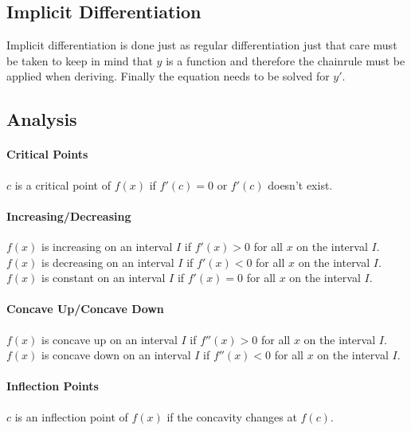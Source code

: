\documentclass[a4paper, 10pt]{article}
\begin{document}
\subsection{Implicit Differentiation}
Implicit differentiation is done just as regular differentiation just that care must be taken to keep in mind that \(y\) is a function and therefore the chainrule must be applied when deriving. Finally the equation needs to be solved for \(y'\).
\subsection{Analysis}
\paragraph{Critical Points}
\( c \) is a critical point of \( f(x) \) if \( f'(c)=0 \) or \( f'(c) \) doesn't exist.
\paragraph{Increasing/Decreasing}
\( f(x) \) is increasing on an interval \(I\) if \( f'(x) > 0 \) for all \(x\) on the interval \(I\).
\( f(x) \) is decreasing on an interval \(I\) if \( f'(x) < 0 \) for all \(x\) on the interval \(I\).
\( f(x) \) is constant on an interval \(I\) if \( f'(x) = 0 \) for all \(x\) on the interval \(I\).
\paragraph{Concave Up/Concave Down}
\( f(x) \) is concave up on an interval \(I\) if \( f''(x) > 0 \) for all \(x\) on the interval \(I\).
\( f(x) \) is concave down on an interval \(I\) if \( f''(x) < 0 \) for all \(x\) on the interval \(I\).
\paragraph{Inflection Points}
\( c \) is an inflection point of \( f(x) \) if the concavity changes at \(f(c)\).
\end{document}
